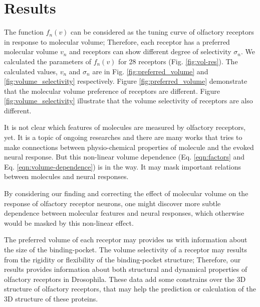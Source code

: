 \documentclass[11pt]{paper} %
\begin{document}
\section{Results}
The function $f_n(v)$ can be considered as the tuning curve of olfactory receptors in response to molecular volume;
Therefore, each receptor has a preferred molecular volume $v_n$ and receptors can show different degree of selectivity $\sigma_n$.
We calculated the parameters of $f_n(v)$ for 28 receptors (Fig. \ref{fig:vol-res}). 
The calculated values, $v_n$ and $\sigma_n$ are in Fig. \ref{fig:preferred_volume} and \ref{fig:volume_selectivity} respectively.
Figure \ref{fig:preferred_volume} demonstrate that the molecular volume preference of receptors are different. 
Figure \ref{fig:volume_selectivity} illustrate that the volume selectivity of receptors are also different.

It is not clear which features of molecules are measured by olfactory receptors, yet. 
It is a topic of ongoing researches 
and there are many works that tries to make connections between physio-chemical properties of molecule 
and the evoked neural response. 
But this non-linear volume dependence (Eq. \ref{eqn:factors} and Eq. \ref{eqn:volume-dependence}) is in the way. 
It may mask important relations between molecules and neural responses.

By considering our finding and correcting the effect of molecular volume on the response of olfactory receptor neurons, 
one might discover more subtle dependence between molecular features and neural responses, 
which otherwise would be masked by this non-linear effect.

The preferred volume of each receptor may provides us with information about the size of the binding-pocket.
The volume selectivity of a receptor may results from the rigidity or flexibility of the binding-pocket structure; 
Therefore, our results provides information about both structural and dynamical properties of olfactory receptors in Drosophila. 
These data add some constrains over the 3D structure of olfactory receptors, 
that may help the prediction or calculation of the 3D structure of these proteins. 
\end{document}
